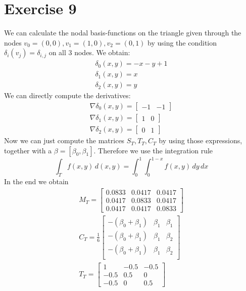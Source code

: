 \documentclass[a4paper]{amsart}
\begin{document}
\section*{Exercise 9}
We can calculate the nodal basis-functions on the triangle given through the nodes $v_0=(0,0), v_1=(1,0), v_2=(0,1)$ by using the condition $\delta_i(v_j) = \delta_{i,j}$ on all 3 nodes. We obtain:
	\begin{eqnarray*}
		\delta_0(x,y) = -x -y +1\\
		\delta_1(x,y) = x\\
		\delta_2(x,y) = y
	\end{eqnarray*}
	We can directly compute the derivatives:
	\begin{eqnarray*}
		\nabla\delta_0(x,y) = \begin{bmatrix} -1&-1\end{bmatrix}\\
		\nabla\delta_1(x,y) = \begin{bmatrix} 1&0\end{bmatrix}\\
		\nabla\delta_2(x,y) = \begin{bmatrix} 0&1\end{bmatrix}
	\end{eqnarray*}
	Now we can just compute the matrices $S_T,T_T,C_T$ by using those expressions, together with a $\beta=[\beta_0,\beta_1]$. Therefore we use the integration rule
	\[
		\int_T f(x,y)\,d(x,y) = \int_0^1\int_0^{1-x} f(x,y)\,dy\,dx
	\]In the end we obtain
	\begin{eqnarray*}
		M_T = 	\begin{bmatrix}
					0.0833 & 0.0417 & 0.0417\\
					0.0417 & 0.0833 & 0.0417\\
					0.0417 & 0.0417 & 0.0833 
				\end{bmatrix}
				\\
		C_T = 	\frac{1}{6}\begin{bmatrix}
					-(\beta_0+\beta_1) & \beta_1 & \beta_1 \\
					-(\beta_0+\beta_1) & \beta_1 & \beta_2 \\
					-(\beta_0+\beta_1) & \beta_1 & \beta_2 \\
				\end{bmatrix}
				\\
		T_T = 	\begin{bmatrix}
					1 & -0.5 & -0.5\\
					-0.5 & 0.5 & 0\\
					-0.5 & 0 & 0.5
				\end{bmatrix}
	\end{eqnarray*}
\end{document}
